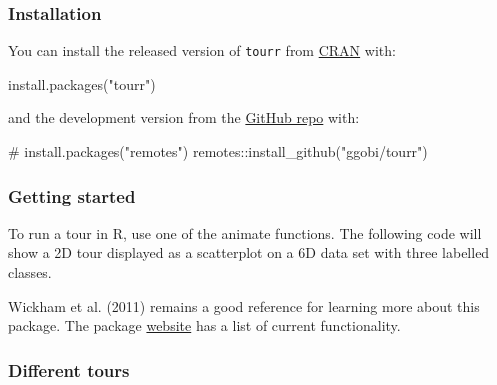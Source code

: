 \documentclass[
  letterpaper,
]{krantz}
\newenvironment{Shaded}{\begin{snugshade}}{\end{snugshade}}
\newcommand{\AttributeTok}[1]{\textcolor[rgb]{0.40,0.45,0.13}{#1}}
\newcommand{\CommentTok}[1]{\textcolor[rgb]{0.37,0.37,0.37}{#1}}
\newcommand{\DecValTok}[1]{\textcolor[rgb]{0.68,0.00,0.00}{#1}}
\newcommand{\FunctionTok}[1]{\textcolor[rgb]{0.28,0.35,0.67}{#1}}
\newcommand{\NormalTok}[1]{\textcolor[rgb]{0.00,0.23,0.31}{#1}}
\newcommand{\SpecialCharTok}[1]{\textcolor[rgb]{0.37,0.37,0.37}{#1}}
\newcommand{\StringTok}[1]{\textcolor[rgb]{0.13,0.47,0.30}{#1}}
\begin{document}
\subsubsection{Installation}\label{installation}

You can install the released version of \texttt{tourr} from
\href{https://CRAN.R-project.org}{CRAN} with:

\begin{Shaded}
\begin{Highlighting}[]
\FunctionTok{install.packages}\NormalTok{(}\StringTok{"tourr"}\NormalTok{)}
\end{Highlighting}
\end{Shaded}

and the development version from the
\href{https://github.com/ggobi/tourr}{GitHub repo} with:

\begin{Shaded}
\begin{Highlighting}[]
\CommentTok{\# install.packages("remotes")}
\NormalTok{remotes}\SpecialCharTok{::}\FunctionTok{install\_github}\NormalTok{(}\StringTok{"ggobi/tourr"}\NormalTok{)}
\end{Highlighting}
\end{Shaded}

\subsubsection{Getting started}\label{getting-started}

To run a tour in R, use one of the animate functions. The following code
will show a 2D tour displayed as a scatterplot on a 6D data set with
three labelled classes.

\begin{Shaded}
\end{Shaded}

Wickham et al. (2011) remains a good reference for learning more about
this package. The package \href{http://ggobi.github.io/tourr/}{website}
has a list of current functionality.

\subsubsection{Different tours}\label{different-tours}
\end{document}
